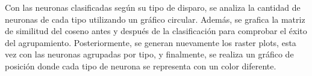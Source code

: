 Con las neuronas clasificadas según su tipo de disparo, se analiza la cantidad de neuronas de cada tipo utilizando un gráfico circular. Además, se grafica la matriz de similitud del coseno antes y después de la clasificación para comprobar el éxito del agrupamiento. Posteriormente, se generan nuevamente los raster plots, esta vez con las neuronas agrupadas por tipo, y finalmente, se realiza un gráfico de posición donde cada tipo de neurona se representa con un color diferente.\\